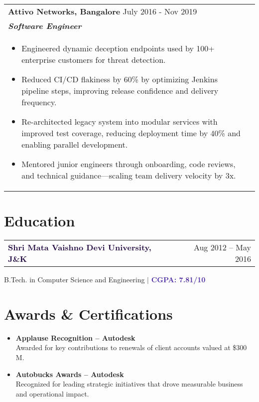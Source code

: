 \documentclass[a4paper,10pt]{article}
\begin{document}
\begin{tabularx}{\linewidth}{ @{}l r@{} }
\color[HTML]{1C033C} \textbf{{Attivo Networks, Bangalore}} \hfill \color[HTML]{371e77} July 2016 - Nov 2019 \\[4pt]
\color[HTML]{371e77}\textbf{\textit{Software Engineer}}\ \hfill \color[HTML]{4B28A4} \\[5pt]
\begin{minipage}[t]{\linewidth}
    \begin{itemize}[nosep,after=\strut, leftmargin=2em, itemsep=2pt]
        \item Engineered dynamic deception endpoints used by 100+ enterprise customers for threat detection.
        \item Reduced CI/CD flakiness by 60\% by optimizing Jenkins pipeline steps, improving release confidence and delivery frequency. 
        \item Re-architected legacy system into modular services with improved test coverage, reducing deployment time by 40\% and enabling parallel development. 
        \item Mentored junior engineers through onboarding, code reviews, and technical guidance—scaling team delivery velocity by 3x. 
              
    \end{itemize}
\end{minipage}
\end{tabularx}

\section{Education}
\begin{tabularx}{\linewidth}{@{}X r@{}}
\textbf{\textcolor[HTML]{1C033C}{Shri Mata Vaishno Devi University, J\&K}} & 
\textcolor[HTML]{371e77}{Aug 2012 -- May 2016} \\
\end{tabularx}
\textcolor[HTML]{371e77}{B.Tech. in Computer Science and Engineering} $|$
\textcolor[HTML]{4B28A4} {\textbf{CGPA: 7.81/10}} \\

\section{Awards \& Certifications}
\begin{itemize}[leftmargin=1.5em, label={}]
    \item \textbf{Applause Recognition – Autodesk} \\
    Awarded for key contributions to renewals of client accounts valued at \$300 M.
    \item \textbf{Autobucks Awards – Autodesk} \\
    Recognized for leading strategic initiatives that drove measurable business and operational impact.
\end{itemize}
\end{document}
